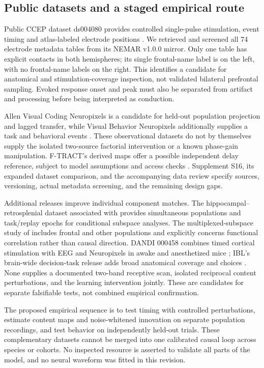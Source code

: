 \documentclass[submission,nolinenumbers]{esj}
\begin{document}
\subsection{Public datasets and a staged empirical route}\label{sec:publicdata}
Public CCEP dataset ds004080 provides controlled single-pulse stimulation, event timing and atlas-labeled electrode positions \citep{vanblooijs2023,ccepdata}. We retrieved and screened all 74 electrode metadata tables from its NEMAR v1.0.0 mirror. Only one table has explicit contacts in both hemispheres; its single frontal-name label is on the left, with no frontal-name labels on the right. This identifies a candidate for anatomical and stimulation-coverage inspection, not validated bilateral prefrontal sampling. Evoked response onset and peak must also be separated from artifact and processing before being interpreted as conduction.

Allen Visual Coding Neuropixels is a candidate for held-out population projection and lagged transfer, while Visual Behavior Neuropixels additionally supplies a task and behavioral events \citep{allencoding,allenbehavior}. These observational datasets do not by themselves supply the isolated two-source factorial intervention or a known phase-gain manipulation. F-TRACT's derived maps offer a possible independent delay reference, subject to model assumptions and access checks \citep{ftractatlas}. Supplement S16, its expanded dataset comparison, and the accompanying data review specify sources, versioning, actual metadata screening, and the remaining design gaps.

Additional releases improve individual component matches. The hippocampal--retrosplenial dataset associated with \citet{gonzalez2026} provides simultaneous populations and task/replay epochs for conditional subspace analyses. The multiplexed-subspace study of \citet{macdowell2025} includes frontal and other populations and explicitly concerns functional correlation rather than causal direction. DANDI 000458 combines timed cortical stimulation with EEG and Neuropixels in awake and anesthetized mice \citep{claar2023}; IBL's brain-wide decision-task release adds broad anatomical coverage and choices \citep{ibl2025data}. None supplies a documented two-band receptive scan, isolated reciprocal content perturbations, and the learning intervention jointly. These are candidates for separate falsifiable tests, not combined empirical confirmation.

The proposed empirical sequence is to test timing with controlled perturbations, estimate content maps and noise-whitened innovation on separate population recordings, and test behavior on independently held-out trials. These complementary datasets cannot be merged into one calibrated causal loop across species or cohorts. No inspected resource is asserted to validate all parts of the model, and no neural waveform was fitted in this revision.
\end{document}
